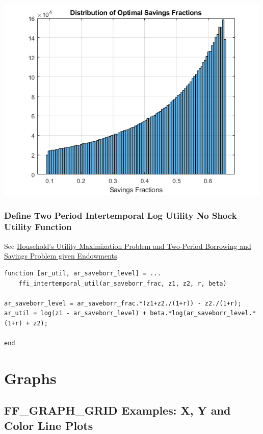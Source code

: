 \documentclass[
]{book}
\begin{document}
\includegraphics[width=5.20833in,height=\textheight]{img/fx_optim_mzoom_savezrone_images/figure_4.png}

\hypertarget{define-two-period-intertemporal-log-utility-no-shock-utility-function}{%
\subsection{Define Two Period Intertemporal Log Utility No Shock Utility Function}\label{define-two-period-intertemporal-log-utility-no-shock-utility-function}}

See \href{https://fanwangecon.github.io/Math4Econ/derivative_application/htmlpdfm/K_save_households.html}{Household's Utility Maximization Problem and Two-Period Borrowing
and Savings Problem given
Endowments}.

\begin{verbatim}
function [ar_util, ar_saveborr_level] = ...
    ffi_intertemporal_util(ar_saveborr_frac, z1, z2, r, beta)

ar_saveborr_level = ar_saveborr_frac.*(z1+z2./(1+r)) - z2./(1+r);
ar_util = log(z1 - ar_saveborr_level) + beta.*log(ar_saveborr_level.*(1+r) + z2);

end
\end{verbatim}

\hypertarget{graphs}{%
\chapter{Graphs}\label{graphs}}

\hypertarget{ff_graph_grid-examples-x-y-and-color-line-plots}{%
\section{FF\_GRAPH\_GRID Examples: X, Y and Color Line Plots}\label{ff_graph_grid-examples-x-y-and-color-line-plots}}
\end{document}
